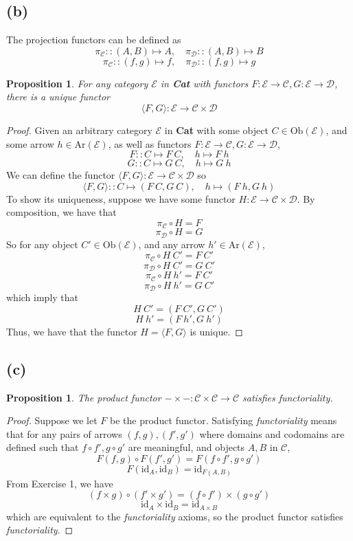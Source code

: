 \documentclass[11pt]{article} %
\newtheorem{proposition}[theorem]{Proposition}
\theoremstyle{definition}
\begin{document}
\subsection*{(b)}
The projection functors can be defined as
\[\pi_{\mathcal{C}} :: (A,B) \mapsto A,\quad \pi_{\mathcal{D}} :: (A,B) \mapsto B\]
\[\pi_{\mathcal{C}} :: (f,g) \mapsto f,\quad \pi_{\mathcal{D}} :: (f,g) \mapsto g\]
\begin{proposition}
For any category $\mathcal{E}$ in \textbf{Cat} with functors
$F:\mathcal{E}\rightarrow \mathcal{C},G:\mathcal{E}\rightarrow \mathcal{D}$,
there is a unique functor 
\[\langle F,G\rangle : \mathcal{E} \rightarrow \mathcal{C}\times \mathcal{D}\]
\end{proposition}
\begin{proof}
  Given an arbitrary category $\mathcal{E}$ in \textbf{Cat} 
  with some object $C\in\text{Ob}(\mathcal{E})$, and some arrow $h\in\text{Ar}(\mathcal{E})$, 
  as well as functors $F:\mathcal{E}\rightarrow \mathcal{C},G:\mathcal{E}\rightarrow \mathcal{D}$,
  \[F:: C \mapsto F\ C,\quad h \mapsto F\ h\]
  \[G:: C \mapsto G\ C,\quad h \mapsto G\ h\]
  We can define the functor $\langle F,G\rangle:\mathcal{E}\rightarrow \mathcal{C}\times \mathcal{D}$ so
\[\langle F,G\rangle :: C \mapsto (F\ C,G\ C),\quad h \mapsto (F\ h, G\ h)  \]
  To show its uniqueness, suppose we have some functor $H:\mathcal{E}\rightarrow \mathcal{C}\times \mathcal{D}$.
  By composition, we have that 
  \[\pi_{\mathcal{C}} \circ H = F\]
  \[\pi_{\mathcal{D}} \circ H = G\]
  So for any object $C'\in\text{Ob}(\mathcal{E})$, and any arrow $h'\in\text{Ar}(\mathcal{E})$,
  \[\pi_{\mathcal{C}} \circ H\ C' = F\ C'\]
  \[\pi_{\mathcal{D}} \circ H\ C' = G\ C'\]
  \[\pi_{\mathcal{C}} \circ H\ h' = F\ C'\]
  \[\pi_{\mathcal{D}} \circ H\ h' = G\ C'\]
  which imply that 
  \[H\ C' = (F\ C', G\ C')\]
  \[H\ h' = (F\ h', G\ h')\]
  Thus, we have that the functor $H=\langle F,G\rangle$ is unique.
\end{proof}

\subsection*{(c)}
\begin{proposition}
  The product functor $-\times -:\mathcal{C}\times \mathcal{C} \rightarrow \mathcal{C}$ satisfies functoriality.
\end{proposition}

\begin{proof}
  Suppose we let $F$ be the product functor. 
  Satisfying \textit{functoriality} means that for any pairs of arrows $(f,g),(f',g')$ 
  where domains and codomains are defined such that
  $f\circ f',g\circ g'$ are meaningful, and objects $A,B$ in $\mathcal{C}$,
  \[F(f,g)\circ F(f',g')=F(f\circ f', g\circ g')\]
  \[F(\text{id}_A, \text{id}_B)= \text{id}_{F(A,B)}\]
  From Exercise 1, we have
  \[ (f\times g)\circ (f' \times g') = (f \circ f') \times (g \circ g')\]
  \[ \text{id}_A \times \text{id}_B = \text{id}_{A\times B}\]
  which are equivalent to the \textit{functoriality} axioms, 
  so the product functor satisfies \textit{functoriality}.
\end{proof}
\end{document}
